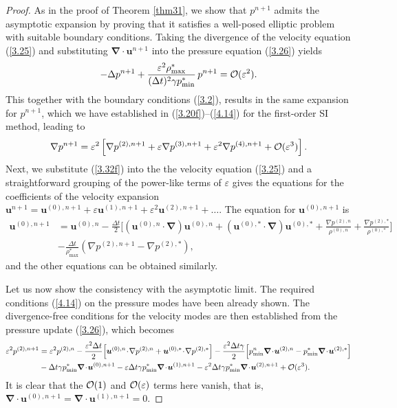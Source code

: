 \documentclass[preprint,12pt]{elsarticle}
\def\muu {\bm{u}}
\def\bnabla{\bm{\nabla}}
\newcommand{\dt}{\Delta t}
\newcommand{\ve}{\varepsilon}
\newcommand\eref[1]{(\ref{#1})}
\begin{document}
\begin{proof}
	As in the proof of Theorem \ref{thm31}, we show that $p^{n+1}$ admits the asymptotic expansion by proving that it satisfies a well-posed
	elliptic problem with suitable boundary conditions. Taking the divergence of the velocity equation \eref{3.25} and substituting
	$\bnabla\!\cdot\!\muu^{n+1}$ into the pressure equation \eref{3.26} yields
	$$
	-\Delta p^{n+1}+\frac{\ve^2\rho_{\max}^*}{(\dt)^2\gamma p_{\min}^*}\,p^{n+1}={\cal O}(\ve^2).
	$$
	This together with the boundary conditions \eref{3.2}, results in the same expansion for $p^{n+1}$, which we have established in
	\eref{3.20f}--\eref{4.14} for the first-order SI method, leading to
	\begin{equation}
		\nabla p^{n+1}=\ve^2\left[\nabla p^{(2),n+1}+\ve\nabla p^{(3),n+1}+\ve^2\nabla p^{(4),n+1}+{\cal O}(\ve^3)\right].
		\label{3.32f}
	\end{equation}
	Next, we substitute \eref{3.32f} into the the velocity equation \eref{3.25} and a straightforward grouping of the power-like terms of $\ve$
	gives the equations for the coefficients of the velocity expansion
	$\bm u^{n+1}=\bm u^{(0),n+1}+\ve\bm u^{(1),n+1}+\ve^2\bm u^{(2),n+1}+\dots$. The equation for $\bm u^{(0),n+1}$ is
	\begin{equation}
		\begin{aligned}
			\bm u^{(0),n+1}&=\bm u^{(0),n}-\frac{\dt}{2}\bigg[(\bm u^{(0),n}\!\cdot\!\bnabla)\bm u^{(0),n}+(\bm u^{(0),*}\!\cdot\!\bnabla)\bm u^{(0),*}+
			\frac{\nabla p^{(2),n}}{\rho^{(0),n}}+\frac{\nabla p^{(2),*}}{\rho^{(0),*}}\bigg]\\
			&-\frac{\dt}{\rho_{\max}^*}\left(\nabla p^{(2),n+1}-\nabla p^{(2),*}\right),
		\end{aligned}
		\label{3.34}
	\end{equation}
	and the other equations can be obtained similarly.
	
	Let us now show the consistency with the asymptotic limit. The required conditions \eref{4.14} on the pressure modes have been already
	shown. The divergence-free conditions for the velocity modes are then established from the pressure update \eref{3.26}, which becomes
	$$
	\begin{aligned}
		\ve^2p^{(2),n+1}&=\ve^2 p^{(2),n}-\frac{\ve^2\dt}{2}\Big[\bm u^{(0),n}\!\cdot\!\nabla p^{(2),n}+
		\bm u^{(0),*}\!\cdot\!\nabla p^{(2),*}\Big]-
		\frac{\ve^2\dt\gamma}{2}\Big[p_{\min}^n\bnabla\!\cdot\!\bm u^{(2),n}-p_{\min}^*\bnabla\!\cdot\!\bm u^{(2),*}\Big]\\
		&-\dt\gamma p_{\min}^*\bnabla\!\cdot\!\bm u^{(0),n+1}-\ve\dt\gamma p_{\min}^*\bnabla\!\cdot\!\bm u^{(1),n+1}-
		\ve^2\dt\gamma p_{\min}^*\bnabla\!\cdot\!\bm u^{(2),n+1}+{\cal O}(\ve^3).
	\end{aligned}
	$$
	It is clear that the ${\cal O}(1)$ and ${\cal O}(\ve)$ terms here vanish, that is,
	$\bnabla\!\cdot\!\bm u^{(0),n+1}=\bnabla\!\cdot\!\bm u^{(1),n+1}=0$.
	

\end{proof}
\end{document}
